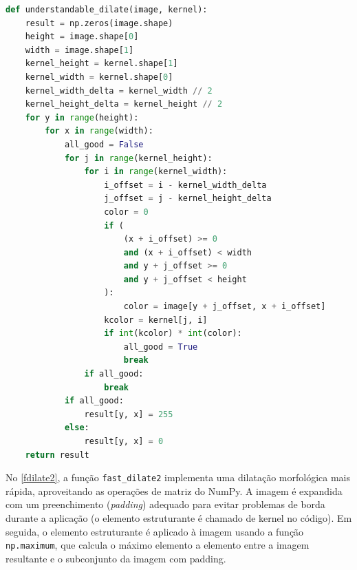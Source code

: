 \documentclass[english, 
               brazil, 
               bsc] %
               {dcomp-abntex2}
\begin{document}
\begin{codigo}[h]
  \caption{\small .}
 \label{udilate}
\begin{lstlisting}[language=python]
def understandable_dilate(image, kernel):
    result = np.zeros(image.shape)
    height = image.shape[0]
    width = image.shape[1]
    kernel_height = kernel.shape[1]
    kernel_width = kernel.shape[0]
    kernel_width_delta = kernel_width // 2
    kernel_height_delta = kernel_height // 2
    for y in range(height):
        for x in range(width):
            all_good = False
            for j in range(kernel_height):
                for i in range(kernel_width):
                    i_offset = i - kernel_width_delta
                    j_offset = j - kernel_height_delta
                    color = 0
                    if (
                        (x + i_offset) >= 0
                        and (x + i_offset) < width
                        and y + j_offset >= 0
                        and y + j_offset < height
                    ):
                        color = image[y + j_offset, x + i_offset]
                    kcolor = kernel[j, i]
                    if int(kcolor) * int(color):
                        all_good = True
                        break
                if all_good:
                    break
            if all_good:
                result[y, x] = 255
            else:
                result[y, x] = 0
    return result
\end{lstlisting}
\end{codigo}


No \autoref{fdilate2}, a função \texttt{fast\_dilate2} implementa uma dilatação morfológica mais rápida, aproveitando as operações de matriz do NumPy. A imagem é expandida com um preenchimento (\textit{padding}) adequado para evitar problemas de borda durante a aplicação (o elemento estruturante é chamado de kernel no código). Em seguida, o elemento estruturante é aplicado à imagem usando a função \texttt{np.maximum}, que calcula o máximo elemento a elemento entre a imagem resultante e o subconjunto da imagem com padding.
\end{document}
